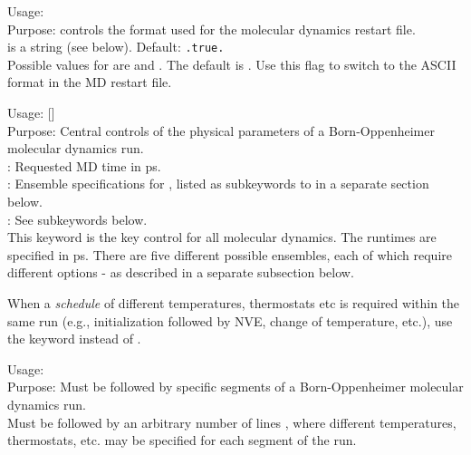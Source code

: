 {\noindent
        Usage:   \\[1.0ex]
        Purpose: controls the format used for the molecular
          dynamics restart file. \\[1.0ex]
         is a string (see below). Default:
          \texttt{.true.} \\
} 
Possible values for  are  and . 
The default is . Use this flag to switch to the ASCII format 
in the MD restart file.


{\noindent
   Usage:   
     [] \\[1.0ex] 
   Purpose: Central controls of the physical parameters of a
     Born-Oppenheimer molecular dynamics run. \\[1.0ex]
    : Requested MD time in ps. \\
    : Ensemble specifications for ,
     listed as subkeywords to  in a separate section
     below. \\
   : See  subkeywords
     below. \\
} 
This keyword is the key control for all molecular dynamics. The
runtimes  are specified in ps. There are five different 
possible ensembles, each of which require different options - as
described in a separate subsection below.

When a \emph{schedule} of different temperatures, thermostats etc is required
within the same run (e.g., initialization followed by NVE, change of
temperature, etc.), use the  keyword instead of
. 

{\noindent
   Usage:  \\[1.0ex] 
   Purpose: Must be followed by specific segments of a 
     Born-Oppenheimer molecular dynamics run. \\
} 
Must be followed by an arbitrary number of lines , where
different temperatures, thermostats, etc. may be specified for each segment of
the run. 

